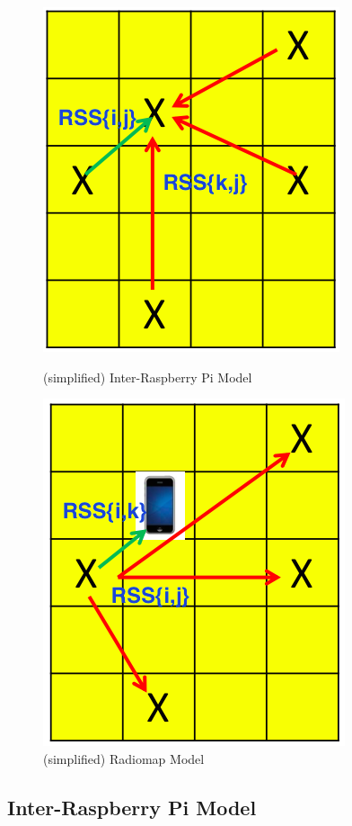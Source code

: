 \documentclass[10pt,conference]{IEEEtran}
\begin{document}
\begin{figure}[htbp]
\begin{minipage}[t]{0.5\textwidth}
	\centering
	\includegraphics[scale=0.3]{model1}
	\caption{(simplified) Inter-Raspberry Pi Model}\label{inter}
\end{minipage}
\begin{minipage}[t]{0.5\textwidth}
	\centering
	\includegraphics[scale=0.3]{model2}
	\caption{(simplified) Radiomap Model}\label{radiomap}
\end{minipage}
\end{figure}

\subsection{Inter-Raspberry Pi Model}
\end{document}
